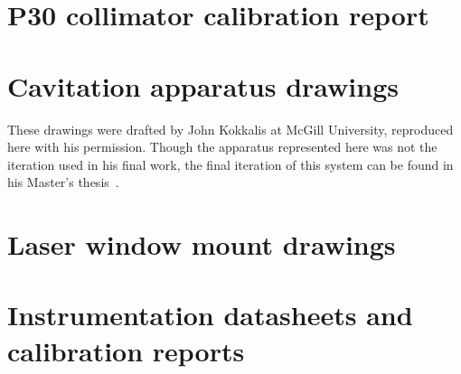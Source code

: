 \documentclass[11pt,a4paper]{report}
\begin{document}
    \chapter{P30 collimator calibration report}
        \label{chp:app_Collimator}
        
    \chapter{Cavitation apparatus drawings}
        These drawings were drafted by John Kokkalis at McGill University, reproduced here with his permission. Though the apparatus represented here was not the iteration used in his final work, the final iteration of this system can be found in his Master's thesis~\cite{kokkalisOnsetCavitationDynamically2023}.
        \label{chp:app_CavitatorDrawings}
        
    \chapter{Laser window mount drawings}
        \label{chp:app_lwmDrawings}
        
    \chapter{Instrumentation datasheets and calibration reports}
        \label{chp:app_calibration}
        
        
        
\end{document}
